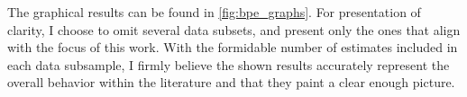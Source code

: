 The graphical results can be found in 
\autoref{fig:bpe_graphs}. For presentation of clarity, I choose to omit several data subsets, and present only the ones that align with the focus of this work. With the formidable number of estimates included in each data subsample, I firmly believe the shown results accurately represent the overall behavior within the literature and that they paint a clear enough picture. 

  

    
